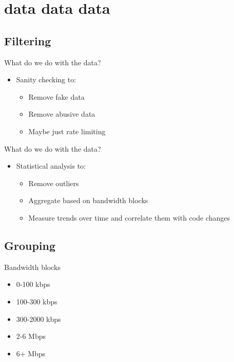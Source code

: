 \documentclass{beamer}
\begin{document}
\section{data data data}

\subsection{Filtering}

\begin{frame}{What do we do with the data?}
  \begin{itemize}
  \item Sanity checking to:
    \begin{itemize}
    \item Remove fake data
    \item Remove abusive data
    \item Maybe just rate limiting
    \end{itemize}
  \end{itemize}
\end{frame}

\begin{frame}{What do we do with the data?}
  \begin{itemize}
  \item Statistical analysis to:
    \begin{itemize}
    \item Remove outliers
    \item Aggregate based on bandwidth blocks
    \item Measure trends over time and correlate them with code changes
    \end{itemize}
  \end{itemize}
\end{frame}

\subsection{Grouping}

\begin{frame}{Bandwidth blocks}
  \begin{itemize}
  \item 0-100 kbps
  \item 100-300 kbps
  \item 300-2000 kbps
  \item 2-6 Mbps
  \item 6+ Mbps
  \end{itemize}
\end{frame}
\end{document}
